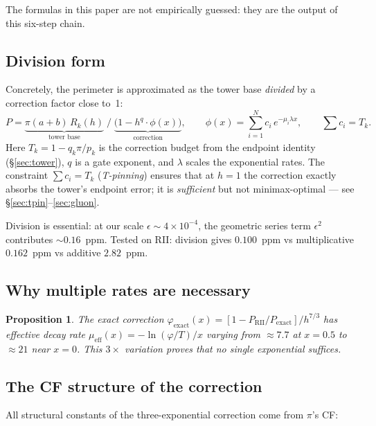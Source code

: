 \documentclass[12pt]{article}
\newtheorem{proposition}[theorem]{Proposition}
\begin{document}
\noindent The formulas in this paper are not empirically guessed: they are the output of this
six-step chain.

\subsection{Division form}

Concretely, the perimeter is approximated as the tower base \emph{divided} by a correction factor close to~1:
\begin{equation}\label{eq:correction}
P = \underbrace{\pi(a+b)\,R_k(h)}_{\text{tower base}} \;\Big/\; \underbrace{\bigl(1 - h^q \cdot \phi(x)\bigr)}_{\text{correction}}, \qquad
\phi(x) = \sum_{i=1}^N c_i\,e^{-\mu_i\lambda x}, \qquad
\sum c_i = T_k.
\end{equation}
Here $T_k = 1 - q_k\pi/p_k$ is the correction budget from the endpoint identity (\S\ref{sec:tower}), $q$ is a gate exponent, and $\lambda$ scales the exponential rates.  The constraint $\sum c_i = T_k$ (\emph{T-pinning}) ensures that at $h = 1$ the correction exactly absorbs the tower's endpoint error; it is \emph{sufficient} but not minimax-optimal --- see \S\ref{sec:tpin}--\ref{sec:gluon}.

Division is essential: at our scale $\epsilon \sim 4\times 10^{-4}$, the geometric series term $\epsilon^2$ contributes $\sim 0.16$~ppm. Tested on RII: division gives $0.100$~ppm vs multiplicative $0.162$~ppm vs additive $2.82$~ppm.

\subsection{Why multiple rates are necessary}

\begin{proposition}
The exact correction $\varphi_{\text{exact}}(x) = [1-P_{\text{RII}}/P_{\text{exact}}]/h^{7/3}$
has effective decay rate $\mu_{\text{eff}}(x) = -\ln(\varphi/T)/x$ varying from $\approx 7.7$
at $x = 0.5$ to $\approx 21$ near $x = 0$. This $3\times$ variation proves that no single
exponential suffices.
\end{proposition}

\subsection{The CF structure of the correction}

All structural constants of the three-exponential correction come from $\pi$'s CF:
\end{document}
